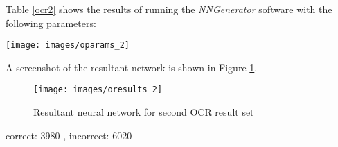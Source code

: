 Table \ref{ocr2} shows the results of running the {\it NNGenerator} software with the following parameters:

\begin{center}
\texttt{[image: images/oparams\_2]}
\end{center}

A screenshot of the resultant network is shown in Figure \ref{oresults_2}.

\begin{figure}[hbt!]
  \centering
  \texttt{[image: images/oresults\_2]}
  \caption{Resultant neural network for second OCR result set}
  \label{oresults_2}
\end{figure}

correct:  3980 , incorrect:  6020

